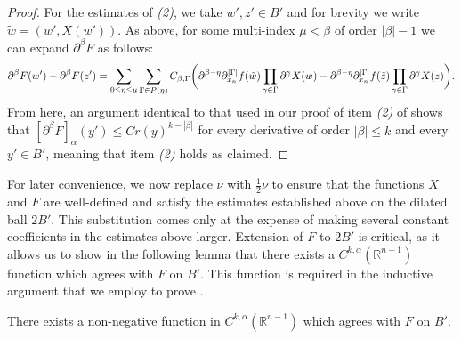 \documentclass[oneside,hidelinks,indentfirst,10pt]{book}
\begin{document}
\begin{proof}
For the estimates of \textit{(2)}, we take \(w',z'\in B'\) and for brevity we write \(\tilde{w}=(w',X(w'))\). As above, for some multi-index \(\mu< \beta\) of order \(|\beta|-1\) we can expand \(\partial^\beta F\) as follows:
\[
    \partial^\beta F(w')-\partial^\beta F(z')= \sum_{0\leq\eta\leq\mu}\sum_{\Gamma\in P(\eta)}C_{\beta,\Gamma}\bigg(\partial^{\beta-\eta}\partial^{|\Gamma|}_{x_n}f(\tilde{w})\prod_{\gamma\in\Gamma}\partial^\gamma X(w)-\partial^{\beta-\eta}\partial^{|\Gamma|}_{x_n}f(\Tilde{z})\prod_{\gamma\in\Gamma}\partial^\gamma X(z)\bigg).
\]
From here, an argument identical to that used in our proof of item \textit{(2)} of  shows that \([\partial^\beta F]_{\alpha}(y')\leq Cr(y)^{k-|\beta|}\) for every derivative of order \(|\beta|\leq k\) and every \(y'\in B'\), meaning that item \textit{(2)} holds as claimed.
\end{proof}


For later convenience, we now replace \(\nu\) with \(\frac{1}{2}\nu\) to ensure that the functions \(X\) and \(F\) are well-defined and satisfy the estimates established above on the dilated ball \(2B'\). This substitution comes only at the expense of making several constant coefficients in the estimates above larger. Extension of \(F\) to \(2B'\) is critical, as it allows us to show in the following lemma that there exists a \(C^{k,\alpha}(\mathbb{R}^{n-1})\) function which agrees with \(F\) on \(B'\). This function is required in the inductive argument that we employ to prove .


\begin{lem}\label{lem:crudeext}
There exists a non-negative function in \( C^{k,\alpha}(\mathbb{R}^{n-1})\) which agrees with \(F\) on \(B'\).
\end{lem}
\end{document}
